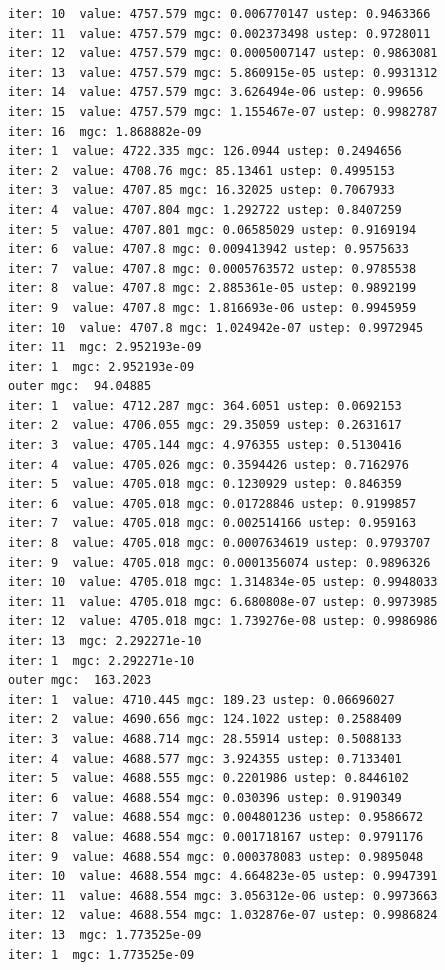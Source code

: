 \documentclass[
  letterpaper,
  DIV=11,
  numbers=noendperiod]{scrartcl}
\begin{document}
\begin{verbatim}
iter: 10  value: 4757.579 mgc: 0.006770147 ustep: 0.9463366 
iter: 11  value: 4757.579 mgc: 0.002373498 ustep: 0.9728011 
iter: 12  value: 4757.579 mgc: 0.0005007147 ustep: 0.9863081 
iter: 13  value: 4757.579 mgc: 5.860915e-05 ustep: 0.9931312 
iter: 14  value: 4757.579 mgc: 3.626494e-06 ustep: 0.99656 
iter: 15  value: 4757.579 mgc: 1.155467e-07 ustep: 0.9982787 
iter: 16  mgc: 1.868882e-09 
iter: 1  value: 4722.335 mgc: 126.0944 ustep: 0.2494656 
iter: 2  value: 4708.76 mgc: 85.13461 ustep: 0.4995153 
iter: 3  value: 4707.85 mgc: 16.32025 ustep: 0.7067933 
iter: 4  value: 4707.804 mgc: 1.292722 ustep: 0.8407259 
iter: 5  value: 4707.801 mgc: 0.06585029 ustep: 0.9169194 
iter: 6  value: 4707.8 mgc: 0.009413942 ustep: 0.9575633 
iter: 7  value: 4707.8 mgc: 0.0005763572 ustep: 0.9785538 
iter: 8  value: 4707.8 mgc: 2.885361e-05 ustep: 0.9892199 
iter: 9  value: 4707.8 mgc: 1.816693e-06 ustep: 0.9945959 
iter: 10  value: 4707.8 mgc: 1.024942e-07 ustep: 0.9972945 
iter: 11  mgc: 2.952193e-09 
iter: 1  mgc: 2.952193e-09 
outer mgc:  94.04885 
iter: 1  value: 4712.287 mgc: 364.6051 ustep: 0.0692153 
iter: 2  value: 4706.055 mgc: 29.35059 ustep: 0.2631617 
iter: 3  value: 4705.144 mgc: 4.976355 ustep: 0.5130416 
iter: 4  value: 4705.026 mgc: 0.3594426 ustep: 0.7162976 
iter: 5  value: 4705.018 mgc: 0.1230929 ustep: 0.846359 
iter: 6  value: 4705.018 mgc: 0.01728846 ustep: 0.9199857 
iter: 7  value: 4705.018 mgc: 0.002514166 ustep: 0.959163 
iter: 8  value: 4705.018 mgc: 0.0007634619 ustep: 0.9793707 
iter: 9  value: 4705.018 mgc: 0.0001356074 ustep: 0.9896326 
iter: 10  value: 4705.018 mgc: 1.314834e-05 ustep: 0.9948033 
iter: 11  value: 4705.018 mgc: 6.680808e-07 ustep: 0.9973985 
iter: 12  value: 4705.018 mgc: 1.739276e-08 ustep: 0.9986986 
iter: 13  mgc: 2.292271e-10 
iter: 1  mgc: 2.292271e-10 
outer mgc:  163.2023 
iter: 1  value: 4710.445 mgc: 189.23 ustep: 0.06696027 
iter: 2  value: 4690.656 mgc: 124.1022 ustep: 0.2588409 
iter: 3  value: 4688.714 mgc: 28.55914 ustep: 0.5088133 
iter: 4  value: 4688.577 mgc: 3.924355 ustep: 0.7133401 
iter: 5  value: 4688.555 mgc: 0.2201986 ustep: 0.8446102 
iter: 6  value: 4688.554 mgc: 0.030396 ustep: 0.9190349 
iter: 7  value: 4688.554 mgc: 0.004801236 ustep: 0.9586672 
iter: 8  value: 4688.554 mgc: 0.001718167 ustep: 0.9791176 
iter: 9  value: 4688.554 mgc: 0.000378083 ustep: 0.9895048 
iter: 10  value: 4688.554 mgc: 4.664823e-05 ustep: 0.9947391 
iter: 11  value: 4688.554 mgc: 3.056312e-06 ustep: 0.9973663 
iter: 12  value: 4688.554 mgc: 1.032876e-07 ustep: 0.9986824 
iter: 13  mgc: 1.773525e-09 
iter: 1  mgc: 1.773525e-09 

\end{verbatim}
\end{document}
